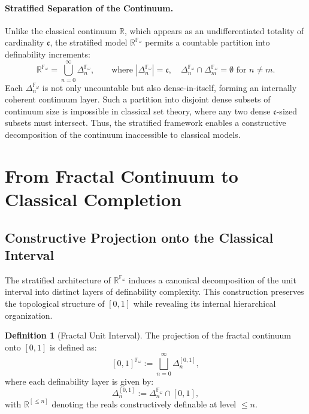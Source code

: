 \documentclass[12pt]{article}
\theoremstyle{definition}
\newtheorem{definition}{Definition}[section]
\theoremstyle{plain}
\theoremstyle{remark}
\begin{document}
\paragraph{Stratified Separation of the Continuum.}
Unlike the classical continuum \( \mathbb{R} \), which appears as an undifferentiated totality of cardinality \( \mathfrak{c} \), the stratified model \( \mathbb{R}^{\mathbb{F}_\omega} \) permits a countable partition into definability increments:
\[
\mathbb{R}^{\mathbb{F}_\omega} = \bigcup_{n=0}^\infty \Delta_n^{\mathbb{F}_\omega}, \qquad \text{where } |\Delta_n^{\mathbb{F}_\omega}| = \mathfrak{c},\quad \Delta_n^{\mathbb{F}_\omega} \cap \Delta_m^{\mathbb{F}_\omega} = \emptyset \text{ for } n \neq m.
\]
Each \( \Delta_n^{\mathbb{F}_\omega} \) is not only uncountable but also dense-in-itself, forming an internally coherent continuum layer. Such a partition into disjoint dense subsets of continuum size is impossible in classical set theory, where any two dense \( \mathfrak{c} \)-sized subsets must intersect. Thus, the stratified framework enables a constructive decomposition of the continuum inaccessible to classical models.

\section{From Fractal Continuum to Classical Completion}

\subsection{Constructive Projection onto the Classical Interval}

The stratified architecture of \( \mathbb{R}^{\mathbb{F}_\omega} \) induces a canonical decomposition of the unit interval into distinct layers of definability complexity. This construction preserves the topological structure of \([0,1]\) while revealing its internal hierarchical organization.

\begin{definition}[Fractal Unit Interval]
The projection of the fractal continuum onto \([0,1]\) is defined as:
\[
[0,1]^{\mathbb{F}_\omega} := \bigsqcup_{n=0}^\infty \Delta_n^{[0,1]},
\]
where each definability layer is given by:
\[
\Delta_n^{[0,1]} := \Delta_n^{\mathbb{F}_\omega} \cap [0,1],
\]
with \( \mathbb{R}^{[\leq n]} \) denoting the reals constructively definable at level \( \leq n \).
\end{definition}
\end{document}
